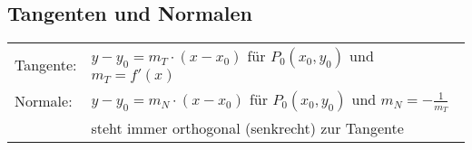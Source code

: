 

\subsection{Tangenten und Normalen}
\begin{table}[H]
  \begin{tabular}{ll}
    Tangente: &$y-y_0=m_T\cdot (x-x_0)$ für $P_0(x_0, y_0)$ und $m_T=f'(x)$ \\
    Normale:  &$y-y_0=m_N\cdot (x-x_0)$ für $P_0(x_0, y_0)$ und $m_N=-\frac{1}{m_T}$ \\
    & steht immer orthogonal (senkrecht) zur Tangente
  \end{tabular}
\end{table}

